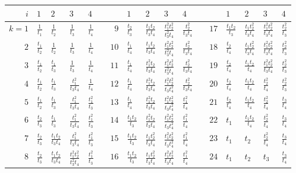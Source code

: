 \documentclass{amsart}
\theoremstyle{plain}
\theoremstyle{definition}
\theoremstyle{remark}
\begin{document}
  \begin{figure}
    \centering \tabulinesep=1.1mm

    \begin{tabu}{r|llll p{0.5in} r|llll p{0.5in} r|llll}
      $i$ & $1$ & $2$ & $3$ & $4$ && & $1$ & $2$ & $3$ & $4$ && & $1$ & $2$ & $3$ & $4$ \\ \hline
      $k=1$ & $\frac{1}{t_1}$ & $\frac{1}{t_2}$ & $\frac{1}{t_3}$ & $\frac{1}{t_4}$ && $9$ & $\frac{t_2}{t_3}$ & $\frac{t_1 t_2}{t_3 t_4}$ & $\frac{t_1^2 t_2^2}{t_3^2 t_4}$ & $\frac{t_2^2}{t_3 t_4}$ && $17$ & $\frac{t_1 t_2}{t_3}$ & $\frac{t_1 t_2^2}{t_3 t_4}$ & $\frac{t_1^2 t_2^2}{t_3 t_4}$ & $\frac{t_2^2}{t_3}$ \\
      $2$ & $\frac{t_1}{t_2}$ & $\frac{1}{t_2}$ & $\frac{1}{t_3}$ & $\frac{1}{t_4}$ && $10$ & $\frac{t_1}{t_4}$ & $\frac{t_1 t_2}{t_3 t_4}$ & $\frac{t_1^2 t_2^2}{t_3^2 t_4}$ & $\frac{t_2^2}{t_3 t_4}$ && $18$ & $\frac{t_2}{t_4}$ & $\frac{t_1 t_2^2}{t_3 t_4}$ & $\frac{t_1^2 t_2^2}{t_3 t_4}$ & $\frac{t_2^2}{t_3}$ \\
      $3$ & $\frac{t_1}{t_2}$ & $\frac{t_1}{t_3}$ & $\frac{1}{t_3}$ & $\frac{1}{t_4}$ && $11$ & $\frac{t_1}{t_4}$ & $\frac{t_1^2 t_2}{t_3 t_4}$ & $\frac{t_1^2 t_2^2}{t_3^2 t_4}$ & $\frac{t_2^2}{t_3 t_4}$ && $19$ & $\frac{t_2}{t_4}$ & $\frac{t_1 t_2}{t_4}$ & $\frac{t_1^2 t_2^2}{t_3 t_4}$ & $\frac{t_2^2}{t_3}$ \\
      $4$ & $\frac{t_1}{t_2}$ & $\frac{t_1}{t_3}$ & $\frac{t_1^2}{t_3 t_4}$ & $\frac{1}{t_4}$ && $12$ & $\frac{t_1}{t_4}$ & $\frac{t_1^2 t_2}{t_3 t_4}$ & $\frac{t_1^2 t_2^2}{t_3 t_4^2}$ & $\frac{t_2^2}{t_3 t_4}$ && $20$ & $\frac{t_2}{t_4}$ & $\frac{t_1 t_2}{t_4}$ & $\frac{t_2^2}{t_4}$ & $\frac{t_2^2}{t_3}$ \\
      $5$ & $\frac{t_1}{t_2}$ & $\frac{t_1}{t_3}$ & $\frac{t_1^2}{t_3 t_4}$ & $\frac{t_1^2}{t_3}$ && $13$ & $\frac{t_1}{t_4}$ & $\frac{t_1^2 t_2}{t_3 t_4}$ & $\frac{t_1^2 t_2^2}{t_3 t_4^2}$ & $\frac{t_1^2}{t_4}$ && $21$ & $\frac{t_2}{t_4}$ & $\frac{t_1 t_2}{t_4}$ & $\frac{t_2^2}{t_4}$ & $\frac{t_3}{t_4}$ \\
      $6$ & $\frac{t_2}{t_3}$ & $\frac{t_1}{t_3}$ & $\frac{t_1^2}{t_3 t_4}$ & $\frac{t_1^2}{t_3}$ && $14$ & $\frac{t_1 t_2}{t_3}$ & $\frac{t_1^2 t_2}{t_3 t_4}$ & $\frac{t_1^2 t_2^2}{t_3 t_4^2}$ & $\frac{t_1^2}{t_4}$ && $22$ & $t_1$ & $\frac{t_1 t_2}{t_4}$ & $\frac{t_2^2}{t_4}$ & $\frac{t_3}{t_4}$ \\
      $7$ & $\frac{t_2}{t_3}$ & $\frac{t_1 t_2}{t_3 t_4}$ & $\frac{t_1^2}{t_3 t_4}$ & $\frac{t_1^2}{t_3}$ && $15$ & $\frac{t_1 t_2}{t_3}$ & $\frac{t_1 t_2^2}{t_3 t_4}$ & $\frac{t_1^2 t_2^2}{t_3 t_4^2}$ & $\frac{t_1^2}{t_4}$ && $23$ & $t_1$ & $t_2$ & $\frac{t_2^2}{t_4}$ & $\frac{t_3}{t_4}$ \\
      $8$ & $\frac{t_2}{t_3}$ & $\frac{t_1 t_2}{t_3 t_4}$ & $\frac{t_1^2 t_2^2}{t_3^2 t_4}$ & $\frac{t_1^2}{t_3}$ && $16$ & $\frac{t_1 t_2}{t_3}$ & $\frac{t_1 t_2^2}{t_3 t_4}$ & $\frac{t_1^2 t_2^2}{t_3 t_4}$ & $\frac{t_1^2}{t_4}$ && $24$ & $t_1$ & $t_2$ & $t_3$ & $\frac{t_3}{t_4}$ \\
    \end{tabu}


\end{figure}
\end{document}
